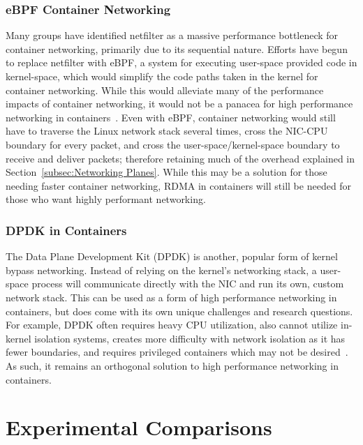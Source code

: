 \documentclass[12pt,titlepage]{article}
\begin{document}
\subsubsection{eBPF Container Networking}
Many groups have identified netfilter as a massive performance bottleneck for container networking, primarily due to its sequential nature.
Efforts have begun to replace netfilter with eBPF, a system for executing user-space provided code in kernel-space, which would simplify the code paths taken in the kernel for container networking.
While this would alleviate many of the performance impacts of container networking, it would not be a panacea for high performance networking in containers~\cite{ciliumiptablesebpf,ciliumebpf}.
Even with eBPF, container networking would still have to traverse the Linux network stack several times, cross the NIC-CPU boundary for every packet, and cross the user-space/kernel-space boundary to receive and deliver packets;
therefore retaining much of the overhead explained in Section~\ref{subsec:Networking Planes}.
While this may be a solution for those needing faster container networking, RDMA in containers will still be needed for those who want highly performant networking.

\subsubsection{DPDK in Containers}
The Data Plane Development Kit (DPDK) is another, popular form of kernel bypass networking.
Instead of relying on the kernel's networking stack, a user-space process will communicate directly with the NIC and run its own, custom network stack.
This can be used as a form of high performance networking in containers, but does come with its own unique challenges and research questions.
For example, DPDK often requires heavy CPU utilization, also cannot utilize in-kernel isolation systems, creates more difficulty with network isolation as it has fewer boundaries, and requires privileged containers which may not be desired~\cite{dpdkcontainers,dpdkperformancecontainers,inteldpdk}.
As such, it remains an orthogonal solution to high performance networking in containers.

\section{Experimental Comparisons}
\end{document}
